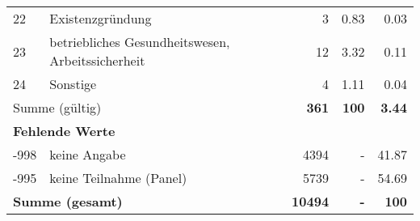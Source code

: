 \begin{longtable}{lXrrr}
        22 & \multicolumn{1}{X}{Existenzgründung} & %
          \num{3} &
          \num[round-mode=places,round-precision=2]{0,83} &
          \num[round-mode=places,round-precision=2]{0,03} \\

        23 & \multicolumn{1}{X}{betriebliches Gesundheitswesen, Arbeitssicherheit} & %
          \num{12} &
          \num[round-mode=places,round-precision=2]{3,32} &
          \num[round-mode=places,round-precision=2]{0,11} \\

        24 & \multicolumn{1}{X}{Sonstige} & %
          \num{4} &
          \num[round-mode=places,round-precision=2]{1,11} &
          \num[round-mode=places,round-precision=2]{0,04} \\

     \midrule
     \multicolumn{2}{l}{Summe (gültig)} &
       \textbf{\num{361}} &
     \textbf{100} &
       \textbf{\num[round-mode=places,round-precision=2]{3,44}} \\
     \multicolumn{5}{l}{\textbf{Fehlende Werte}}\\
       -998 &
       keine Angabe &
         \num{4394} &
        - &
         \num[round-mode=places,round-precision=2]{41,87} \\
       -995 &
       keine Teilnahme (Panel) &
         \num{5739} &
        - &
         \num[round-mode=places,round-precision=2]{54,69} \\
     \midrule
     \multicolumn{2}{l}{\textbf{Summe (gesamt)}} &
          \textbf{\num{10494}} &
        \textbf{-} &
        \textbf{100} \\
     \bottomrule
     \end{longtable}
     
